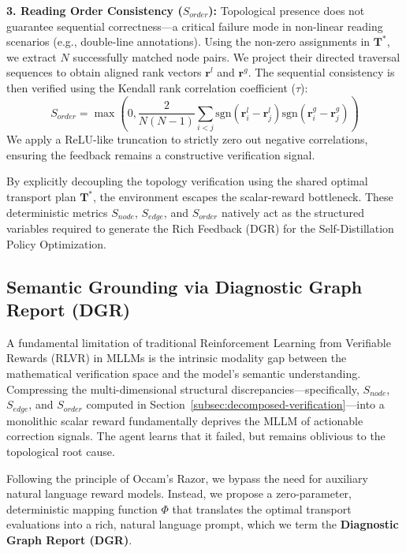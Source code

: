 \documentclass{article}
\begin{document}
\textbf{3. Reading Order Consistency ($S_{order}$):} 
Topological presence does not guarantee sequential correctness—a critical failure mode in non-linear reading scenarios (e.g., double-line annotations). Using the non-zero assignments in $\mathbf{T}^*$, we extract $N$ successfully matched node pairs. We project their directed traversal sequences to obtain aligned rank vectors $\mathbf{r}^l$ and $\mathbf{r}^g$. The sequential consistency is then verified using the Kendall rank correlation coefficient ($\tau$):
\begin{equation}
    S_{order} = \max \left( 0, \frac{2}{N(N-1)} \sum_{i<j} \text{sgn}(\mathbf{r}^l_i - \mathbf{r}^l_j) \text{sgn}(\mathbf{r}^g_i - \mathbf{r}^g_j) \right)
\end{equation}
We apply a ReLU-like truncation to strictly zero out negative correlations, ensuring the feedback remains a constructive verification signal.

By explicitly decoupling the topology verification using the shared optimal transport plan $\mathbf{T}^*$, the environment escapes the scalar-reward bottleneck. These deterministic metrics $S_{node}$, $S_{edge}$, and $S_{order}$ natively act as the structured variables required to generate the Rich Feedback (DGR) for the Self-Distillation Policy Optimization.

\subsection{Semantic Grounding via Diagnostic Graph Report (DGR)}
\label{subsec:dgr}

A fundamental limitation of traditional Reinforcement Learning from Verifiable Rewards (RLVR) in MLLMs is the intrinsic modality gap between the mathematical verification space and the model's semantic understanding. Compressing the multi-dimensional structural discrepancies---specifically, $S_{node}$, $S_{edge}$, and $S_{order}$ computed in Section~\ref{subsec:decomposed-verification}---into a monolithic scalar reward fundamentally deprives the MLLM of actionable correction signals. The agent learns that it failed, but remains oblivious to the topological root cause.

Following the principle of Occam's Razor, we bypass the need for auxiliary natural language reward models. Instead, we propose a zero-parameter, deterministic mapping function $\Phi$ that translates the optimal transport evaluations into a rich, natural language prompt, which we term the \textbf{Diagnostic Graph Report (DGR)}.
\end{document}
